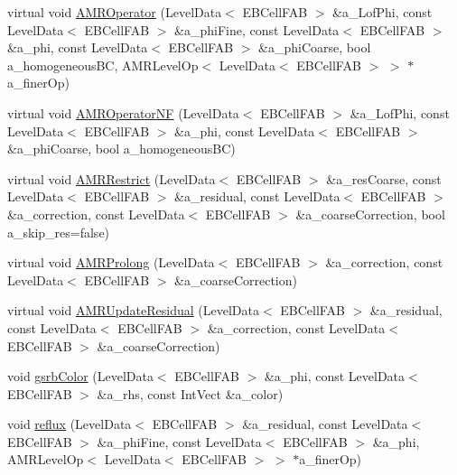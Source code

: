 \begin{DoxyCompactItemize}
\item 
virtual void \hyperlink{classnwoebconductivityop_a89031c0d36a2302cbf2d3fc9b24c0e60}{A\+M\+R\+Operator} (Level\+Data$<$ E\+B\+Cell\+F\+AB $>$ \&a\+\_\+\+Lof\+Phi, const Level\+Data$<$ E\+B\+Cell\+F\+AB $>$ \&a\+\_\+phi\+Fine, const Level\+Data$<$ E\+B\+Cell\+F\+AB $>$ \&a\+\_\+phi, const Level\+Data$<$ E\+B\+Cell\+F\+AB $>$ \&a\+\_\+phi\+Coarse, bool a\+\_\+homogeneous\+BC, A\+M\+R\+Level\+Op$<$ Level\+Data$<$ E\+B\+Cell\+F\+AB $>$ $>$ $\ast$a\+\_\+finer\+Op)
\item 
virtual void \hyperlink{classnwoebconductivityop_a82d18d2286acdfca29d2d9b0e0cc5bd5}{A\+M\+R\+Operator\+NF} (Level\+Data$<$ E\+B\+Cell\+F\+AB $>$ \&a\+\_\+\+Lof\+Phi, const Level\+Data$<$ E\+B\+Cell\+F\+AB $>$ \&a\+\_\+phi, const Level\+Data$<$ E\+B\+Cell\+F\+AB $>$ \&a\+\_\+phi\+Coarse, bool a\+\_\+homogeneous\+BC)
\item 
virtual void \hyperlink{classnwoebconductivityop_ac59316b9fc22ee1f9b4965757ca6b05a}{A\+M\+R\+Restrict} (Level\+Data$<$ E\+B\+Cell\+F\+AB $>$ \&a\+\_\+res\+Coarse, const Level\+Data$<$ E\+B\+Cell\+F\+AB $>$ \&a\+\_\+residual, const Level\+Data$<$ E\+B\+Cell\+F\+AB $>$ \&a\+\_\+correction, const Level\+Data$<$ E\+B\+Cell\+F\+AB $>$ \&a\+\_\+coarse\+Correction, bool a\+\_\+skip\+\_\+res=false)
\item 
virtual void \hyperlink{classnwoebconductivityop_a5b85152676c1f3695238a8586ce50f38}{A\+M\+R\+Prolong} (Level\+Data$<$ E\+B\+Cell\+F\+AB $>$ \&a\+\_\+correction, const Level\+Data$<$ E\+B\+Cell\+F\+AB $>$ \&a\+\_\+coarse\+Correction)
\item 
virtual void \hyperlink{classnwoebconductivityop_ac92e22598a4b1bb2f991e8faac7e69a8}{A\+M\+R\+Update\+Residual} (Level\+Data$<$ E\+B\+Cell\+F\+AB $>$ \&a\+\_\+residual, const Level\+Data$<$ E\+B\+Cell\+F\+AB $>$ \&a\+\_\+correction, const Level\+Data$<$ E\+B\+Cell\+F\+AB $>$ \&a\+\_\+coarse\+Correction)
\item 
void \hyperlink{classnwoebconductivityop_a71c351cba229ac886bc742282e609556}{gsrb\+Color} (Level\+Data$<$ E\+B\+Cell\+F\+AB $>$ \&a\+\_\+phi, const Level\+Data$<$ E\+B\+Cell\+F\+AB $>$ \&a\+\_\+rhs, const Int\+Vect \&a\+\_\+color)
\item 
void \hyperlink{classnwoebconductivityop_a0f19a24c2ce467889c8524a9343dac73}{reflux} (Level\+Data$<$ E\+B\+Cell\+F\+AB $>$ \&a\+\_\+residual, const Level\+Data$<$ E\+B\+Cell\+F\+AB $>$ \&a\+\_\+phi\+Fine, const Level\+Data$<$ E\+B\+Cell\+F\+AB $>$ \&a\+\_\+phi, A\+M\+R\+Level\+Op$<$ Level\+Data$<$ E\+B\+Cell\+F\+AB $>$ $>$ $\ast$a\+\_\+finer\+Op)

\end{DoxyCompactItemize}
